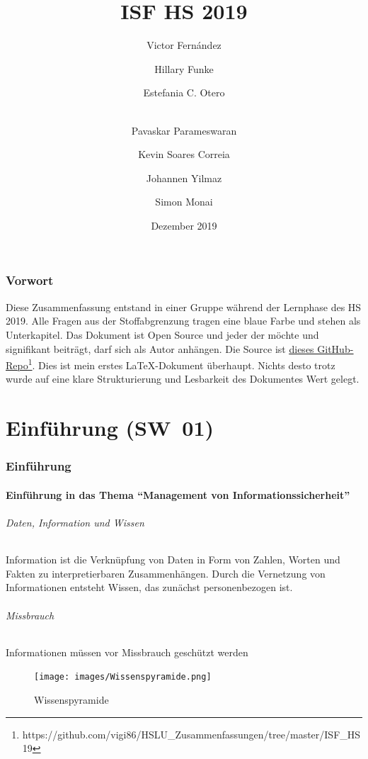 \documentclass[10pt,a4paper]{article}
\title{ISF HS 2019}
\author[1]{Victor Fernández}
\author[2]{Hillary Funke}
\author[2]{Estefania C. Otero}
\author[3]{\\Pavaskar Parameswaran}
\author[3]{Kevin Soares Correia}
\author[2]{Johannen Yilmaz}
\author[2]{Simon Monai}
\affil[1]{HSLU Informatik}
\affil[2]{HSLU Information and Cybersecurity}
\affil[3]{HSLU Wirtschaftsinformatik}
\date{Dezember 2019}
\begin{document}
\maketitle
\thispagestyle{empty}
\section*{Vorwort}Diese Zusammenfassung entstand in einer Gruppe während der Lernphase des HS 2019. Alle Fragen aus der Stoffabgrenzung tragen eine {\color{dunkelblau}blaue Farbe} und stehen als Unterkapitel. Das Dokument ist Open Source und jeder der möchte und signifikant beiträgt, darf sich als Autor anhängen. Die Source ist \underline{\href{https://github.com/vigi86/HSLU_Zusammenfassungen/tree/master/ISF_HS19}{dieses GitHub-Repo}}\footnote{https://github.com/vigi86/HSLU\_Zusammenfassungen/tree/master/ISF\_HS19}. Dies ist mein erstes \LaTeX{}-Dokument überhaupt. Nichts desto trotz wurde auf eine klare Strukturierung und Lesbarkeit des Dokumentes Wert gelegt.
\tableofcontents
\thispagestyle{empty}
\pagebreak


\part{Einführung (SW~01)}

\section{Einführung}

\subsection*{Einführung in das Thema "`Management von Informationssicherheit"'}

\paragraph*{Daten, Information und Wissen}Information ist die Verknüpfung von Daten in Form von Zahlen, Worten und Fakten zu interpretierbaren Zusammenhängen. Durch die Vernetzung von Informationen entsteht Wissen, das zunächst personenbezogen ist.

\paragraph*{Missbrauch}Informationen müssen vor Missbrauch geschützt werden
\begin{figure}[H]
    \begin{center}
    \texttt{[image: images/Wissenspyramide.png]}
    \caption{Wissenspyramide\cite{wiki}}
    \label{Wissenspyramide}
    \end{center}
\end{figure}
\end{document}
